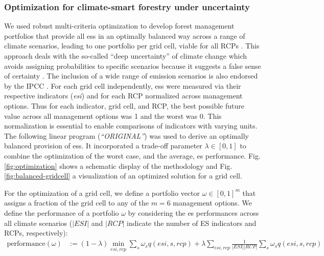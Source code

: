 \documentclass[]{article}
\begin{document}
\subsubsection{Optimization for climate-smart forestry under uncertainty}\label{sec:original-optimization}
We used robust multi-criteria optimization to develop forest management portfolios that provide all \glspl{es} in an optimally balanced way across a range of climate scenarios, leading to one portfolio per grid cell, viable for all RCPs \parencite{Gregor2022}.
This approach deals with the so-called ``deep uncertainty'' of climate change which avoids assigning probabilities to specific scenarios because it suggests a false sense of certainty \parencite{Lawrence2020}. The inclusion of a wide range of emission scenarios is also endorsed by the IPCC \parencite{IPCC2023long}.
For each grid cell independently, \glspl{es} were measured via their respective indicators (\textit{esi}) and for each RCP normalized across management options. Thus for each indicator, grid cell, and RCP, the best possible future value across all management options was 1 and the worst was 0. This normalization is essential to enable comparisons of indicators with varying units.
The following linear program (\textit{``ORIGINAL''})  was used to derive an optimally balanced provision of \glspl{es}. It incorporated a trade-off parameter $\lambda \in [0, 1]$ to combine the optimization of the worst case, and the average, \gls{es} performance.
Fig. \ref{fig:optimization} shows a schematic display of the methodology and Fig. \ref{fig:balanced-gridcell} a visualization of an optimized solution for a grid cell.




\noindent For the optimization of a grid cell, we define a portfolio vector $\omega \in [0, 1]^{m}$ that assigns a fraction of the grid cell to any of the $m=6$ management options. We define the performance of a portfolio $\omega$ by considering the \gls{es} performances across all climate scenarios ($|ESI|$ and $|RCP|$ indicate the number of ES indicators and RCPs, respectively):
\begin{align}
	\mbox{performance}(\omega) &:= (1-\lambda) \min_{esi, rcp} \sum_s \omega_s q(esi, s, rcp) +  \lambda \sum_{esi, rcp} \frac{1}{|ESI||RCP|} \sum_s \omega_s q(esi, s, rcp)  \label{eq:performance_basic}
\end{align}
\end{document}
